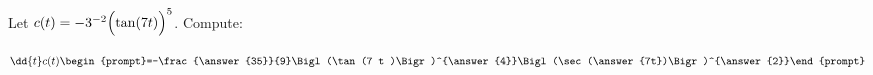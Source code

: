 \documentclass{ximera}
\author{Bart Snapp\and Nela Lakos}
\begin{document}
\begin{exercise}
Let $c(t) = -3^{-2} \Bigl(\tan (7 t )\Bigr)^5$. Compute:

\[
\dd{t}c(t)
\begin{prompt}=-\frac{\answer{35}}{9}\Bigl(\tan (7 t )\Bigr)^{\answer{4}}\Bigl(\sec(\answer{7t})\Bigr)^{\answer{2}}\end{prompt}
\]
\end{exercise}
\end{document}
